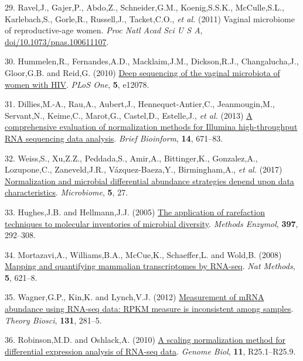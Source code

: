 \documentclass[
]{article}
\newlength{\cslhangindent}
\newenvironment{CSLReferences}[2] %
 {\begin{list}{}{%
  \setlength{\itemindent}{0pt}
  \setlength{\leftmargin}{0pt}
  \setlength{\parsep}{0pt}
  \ifodd #1
   \setlength{\leftmargin}{\cslhangindent}
   \setlength{\itemindent}{-1\cslhangindent}
  \fi
  \setlength{\itemsep}{#2\baselineskip}}}
 {\end{list}}
\begin{document}
\begin{CSLReferences}{1}{1}
29. Ravel,J., Gajer,P., Abdo,Z., Schneider,G.M., Koenig,S.S.K.,
McCulle,S.L., Karlebach,S., Gorle,R., Russell,J., Tacket,C.O., \emph{et
al.} (2011) Vaginal microbiome of reproductive-age women. \emph{Proc
Natl Acad Sci U S A},
\href{https://doi.org/doi/10.1073/pnas.100611107}{doi/10.1073/pnas.100611107}.

30. Hummelen,R., Fernandes,A.D., Macklaim,J.M., Dickson,R.J.,
Changalucha,J., Gloor,G.B. and Reid,G. (2010)
\href{https://doi.org/10.1371/journal.pone.0012078}{Deep sequencing of
the vaginal microbiota of women with {HIV}}. \emph{PLoS One},
\textbf{5}, e12078.

31. Dillies,M.-A., Rau,A., Aubert,J., Hennequet-Antier,C.,
Jeanmougin,M., Servant,N., Keime,C., Marot,G., Castel,D., Estelle,J.,
\emph{et al.} (2013) \href{https://doi.org/10.1093/bib/bbs046}{A
comprehensive evaluation of normalization methods for {Illumina}
high-throughput {RNA} sequencing data analysis}. \emph{Brief Bioinform},
\textbf{14}, 671--83.

32. Weiss,S., Xu,Z.Z., Peddada,S., Amir,A., Bittinger,K., Gonzalez,A.,
Lozupone,C., Zaneveld,J.R., Vázquez-Baeza,Y., Birmingham,A., \emph{et
al.} (2017)
\href{https://doi.org/10.1186/s40168-017-0237-y}{Normalization and
microbial differential abundance strategies depend upon data
characteristics}. \emph{Microbiome}, \textbf{5}, 27.

33. Hughes,J.B. and Hellmann,J.J. (2005)
\href{https://doi.org/10.1016/S0076-6879(05)97017-1}{The application of
rarefaction techniques to molecular inventories of microbial diversity}.
\emph{Methods Enzymol}, \textbf{397}, 292--308.

34. Mortazavi,A., Williams,B.A., McCue,K., Schaeffer,L. and Wold,B.
(2008) \href{https://doi.org/10.1038/nmeth.1226}{Mapping and quantifying
mammalian transcriptomes by {RNA-seq}}. \emph{Nat Methods}, \textbf{5},
621--8.

35. Wagner,G.P., Kin,K. and Lynch,V.J. (2012)
\href{https://doi.org/10.1007/s12064-012-0162-3}{Measurement of mRNA
abundance using RNA-seq data: RPKM measure is inconsistent among
samples}. \emph{Theory Biosci}, \textbf{131}, 281--5.

36. Robinson,M.D. and Oshlack,A. (2010)
\href{https://doi.org/10.1186/gb-2010-11-3-r25}{A scaling normalization
method for differential expression analysis of {RNA-seq} data}.
\emph{Genome Biol}, \textbf{11}, R25.1--R25.9.


\end{CSLReferences}
\end{document}
